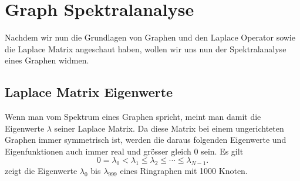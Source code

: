 
\section{Graph Spektralanalyse\label{sec:sgwt:spectralanalysis}}

Nachdem wir nun die Grundlagen von Graphen und den Laplace Operator sowie die 
Laplace Matrix angeschaut haben, wollen wir uns nun der Spektralanalyse eines 
Graphen widmen.

\subsection{Laplace Matrix Eigenwerte}

Wenn man vom Spektrum eines Graphen spricht, meint man damit die Eigenwerte 
$\lambda$ seiner Laplace Matrix. Da diese Matrix bei einem ungerichteten 
Graphen immer symmetrisch ist, werden die daraus folgenden Eigenwerte und 
Eigenfunktionen auch immer real und gr\"osser gleich $0$ sein. Es gilt
\begin{equation}
0 = \lambda_0 < \lambda_1 \leq \lambda_2 \leq \cdots \leq \lambda_{N-1}.
\label{eq:sgwt:lambda:series}
\end{equation}
 zeigt die Eigenwerte $\lambda_0$ bis 
$\lambda_{999}$ eines Ringraphen mit 1000 Knoten.


